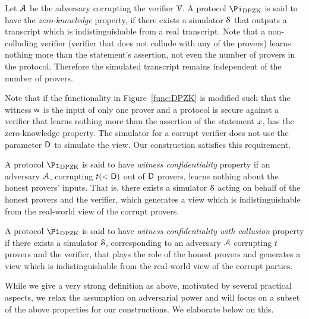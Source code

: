  Let $\mathcal{A}$ be the adversary corrupting the verifier $\mathcal{V}$. A protocol $\Pi_{\DPZK}$ is said to have the \textit{zero-knowledge} property, if there exists a simulator $\mathcal{S}$ that outputs a transcript which is indistinguishable from a real transcript. Note that a non-colluding verifier (verifier that does not collude with any of the provers) learns nothing more than the statement's assertion, not even the number of provers in the protocol. Therefore the simulated transcript remains independent of the number of provers.

Note that if the functionality in Figure~\ref{func:DPZK} is modified such that the witness $\mathsf{w}$ is the input of only one prover and a protocol is secure against a verifier that learns nothing more than the assertion of the statement ${x}$, has the zero-knowledge property. The simulator for a corrupt verifier does not use the parameter $\mathsf{D}$ to simulate the view. Our construction satisfies this requirement.

 A protocol $\Pi_{\DPZK}$ is said to have \textit{witness confidentiality} property if an adversary $\mathcal{A}$, corrupting $t( < \mathsf{D})$ out of $\mathsf{D}$ provers, learns nothing about the honest provers' inputs. That is, there exists a simulator $\mathcal{S}$ acting on behalf of the honest provers and the verifier, which generates a view which is indistinguishable from the real-world view of the corrupt provers.

  A protocol $\Pi_{\DPZK}$ is said to have \textit{witness confidentiality with collusion} property if there exists a simulator $\mathcal{S}$, corresponding to an adversary $\mathcal{A}$ corrupting $t$ provers and the verifier, that plays the role of the honest provers and generates a view which is indistinguishable from the real-world view of the corrupt parties.

While we give a very strong definition as above, motivated by several practical aspects, we relax the assumption on adversarial power and will focus on a subset of the above properties for our constructions. We elaborate below on this.

